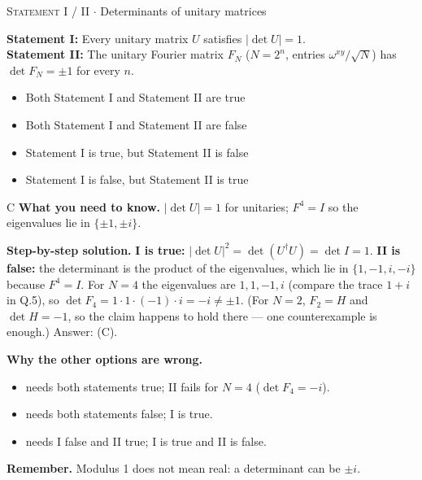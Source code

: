 \documentclass[11pt,a4paper]{article}
\newcommand{\optlabel}[1]{\textbf{(#1)}}
\newcommand{\correctlabel}[1]{\textcolor{okgreen}{\textbf{(#1)}\,\ding{51}}}
\newenvironment{qitem}[1]{\begin{list}{}{\setlength{\leftmargin}{3.3em}\setlength{\labelwidth}{3.1em}%
  \setlength{\labelsep}{0.2em}\setlength{\topsep}{3pt}\setlength{\parsep}{3pt}}\item[\textbf{Q.#1}\hfill]}{\end{list}}
\newcommand{\qsep}{\par\vspace{2pt}{\color{black!15}\hrule}\vspace{4pt}}
\newcommand{\qmeta}[2]{{\footnotesize\color{black!60}\textsc{#1} \;$\cdot$\; #2}\par}
\begin{document}
\begin{qitem}{18}
\qmeta{Statement I / II}{Determinants of unitary matrices}
\textbf{Statement I:} Every unitary matrix $U$ satisfies $|\det U| = 1$.\\[1mm]
\textbf{Statement II:} The unitary Fourier matrix $F_N$ ($N = 2^n$, entries $\omega^{xy}/\sqrt N$) has $\det F_N = \pm 1$ for every $n$.
\begin{itemize}[leftmargin=2.6em, labelsep=0.4em, itemsep=2pt, topsep=3pt]
\item[\optlabel{A}] Both Statement I and Statement II are true
\item[\optlabel{B}] Both Statement I and Statement II are false
\item[\correctlabel{C}] Statement I is true, but Statement II is false
\item[\optlabel{D}] Statement I is false, but Statement II is true
\end{itemize}
\end{qitem}
\begin{solbox}{C}
\textbf{\color{brand}What you need to know.} $|\det U| = 1$ for unitaries; $F^4 = I$ so the eigenvalues lie in $\{\pm1, \pm i\}$.

\textbf{\color{brand}Step-by-step solution.} \textbf{I is true:} $|\det U|^2 = \det(U^\dagger U) = \det I = 1$.
\textbf{II is false:} the determinant is the product of the eigenvalues, which lie in $\{1,-1,i,-i\}$ because $F^4 = I$.
For $N = 4$ the eigenvalues are $1, 1, -1, i$ (compare the trace $1 + i$ in Q.5), so $\det F_4 = 1\cdot1\cdot(-1)\cdot i = -i \neq \pm1$.
(For $N = 2$, $F_2 = H$ and $\det H = -1$, so the claim happens to hold there --- one counterexample is enough.) Answer: (C).

\textbf{\color{brand}Why the other options are wrong.}
\begin{itemize}[leftmargin=2.4em, itemsep=1pt, topsep=2pt]
\item[\textbf{(A)}] needs both statements true; II fails for $N = 4$ ($\det F_4 = -i$).
\item[\textbf{(B)}] needs both statements false; I is true.
\item[\textbf{(D)}] needs I false and II true; I is true and II is false.
\end{itemize}
\textbf{\color{brand}Remember.} Modulus 1 does not mean real: a determinant can be $\pm i$.
\end{solbox}
\qsep
\end{document}
